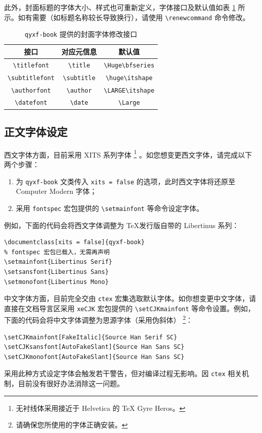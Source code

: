 \documentclass[
    10pt,
    oneside,
    openany,
    b5paper,
    colorscheme = basic  %
]{qyxf-book}
\renewcommand{\titlefont}{\Huge\bfseries}
\renewcommand{\subtitlefont}{\LARGE\itshape}
\begin{document}
此外，封面标题的字体大小、样式也可重新定义，字体接口及默认值如表 \ref{tab:preface-font} 所示。如有需要（如标题名称较长导致换行），请使用 \verb|\renewcommand| 命令修改。

\begin{table}[htbp]
\centering
\caption{\texttt{qyxf-book} 提供的封面字体修改接口}
\label{tab:preface-font}
\begin{tabular}{ccc}
\toprule
接口 & 对应元信息 & 默认值\\
\midrule
\verb|\titlefont| & \verb|\title| & \verb|\Huge\bfseries| \\
\verb|\subtitlefont| & \verb|\subtitle| & \verb|\huge\itshape| \\
\verb|\authorfont| & \verb|\author| & \verb|\LARGE\itshape| \\
\verb|\datefont| & \verb|\date| & \verb|\Large| \\
\bottomrule
\end{tabular}
\end{table}

\subsection{正文字体设定}

西文字体方面，目前采用 XITS 系列字体
\footnote{无衬线体采用接近于 Helvetica 的 \TeX{} Gyre Heros。}
。如您想变更西文字体，请完成以下两个步骤：

\begin{enumerate}
    \item 为 \verb|qyxf-book| 文类传入 \verb|xits = false| 的选项，此时西文字体将还原至 Computer Modern 字体；
    \item 采用 \verb|fontspec| 宏包提供的 \verb|\setmainfont| 等命令设定字体。
\end{enumerate}

例如，下面的代码会将西文字体调整为 \TeX 发行版自带的 Libertinus 系列：

\begin{tcolorbox}
\begin{verbatim}
\documentclass[xits = false]{qyxf-book}
% fontspec 宏包已载入，无需再声明
\setmainfont{Libertinus Serif}
\setsansfont{Libertinus Sans}
\setmonofont{Libertinus Mono}
\end{verbatim}
\end{tcolorbox}

中文字体方面，目前完全交由 \verb|ctex| 宏集选取默认字体。如你想变更中文字体，请直接在文档导言区采用 \verb|xeCJK| 宏包提供的 \verb|\setCJKmainfont| 等命令设置。例如，下面的代码会将中文字体调整为思源字体（采用伪斜体）
\footnote{请确保您所使用的字体正确安装。}：
\begin{tcolorbox}
\begin{verbatim}
\setCJKmainfont[FakeItalic]{Source Han Serif SC}
\setCJKsansfont[AutoFakeSlant]{Source Han Sans SC}
\setCJKmonofont[AutoFakeSlant]{Source Han Sans SC}
\end{verbatim}
\end{tcolorbox}
采用此种方式设定字体会触发若干警告，但对编译过程无影响。因 \verb|ctex| 相关机制，目前没有很好办法消除这一问题。
\end{document}
